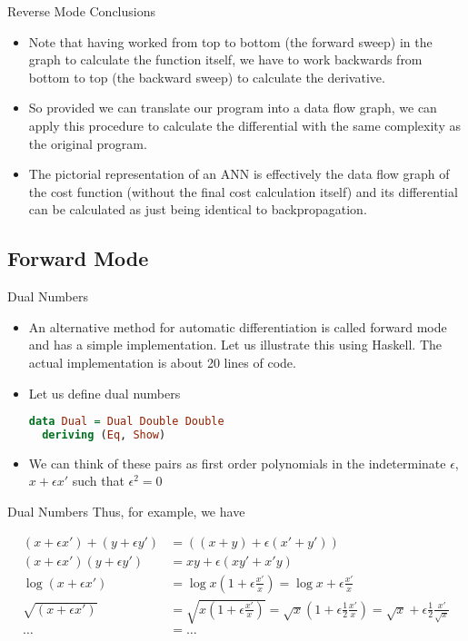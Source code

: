 \documentclass{beamer}
\begin{document}
\begin{frame}[fragile]{Reverse Mode Conclusions}
\begin{itemize}
\item
Note that having worked from top to bottom (the forward sweep) in the
graph to calculate the function itself, we have to work backwards from
bottom to top (the backward sweep) to calculate the derivative.
\item
So provided we can translate our program into a data flow graph, we can
apply this procedure to calculate the differential with the same
complexity as the original program.
\item
The pictorial representation of an ANN is effectively the data flow
graph of the cost function (without the final cost calculation itself)
and its differential can be calculated as just being identical to
backpropagation.
\end{itemize}
\end{frame}

\subsection{Forward Mode}

\begin{frame}[fragile]{Dual Numbers}
\begin{itemize}
\item
An alternative method for automatic differentiation is called forward
mode and has a simple implementation. Let us illustrate this using
Haskell. The actual implementation is about 20 lines of code.
\item
Let us define dual numbers

\begin{lstlisting}[language=Haskell]
data Dual = Dual Double Double
  deriving (Eq, Show)
\end{lstlisting}
\item
We can think of these pairs as first order polynomials in the
indeterminate $\epsilon$, $x + \epsilon x'$ such that $\epsilon^2 = 0$
\end{itemize}
\end{frame}

\begin{frame}[fragile]{Dual Numbers}
Thus, for example, we have

$$
\begin{aligned}
(x + \epsilon x') + (y + \epsilon y') &= ((x + y) + \epsilon (x' + y')) \\
(x + \epsilon x')(y + \epsilon y') &= xy + \epsilon (xy' + x'y) \\
\log (x + \epsilon x') &=
\log x (1 + \epsilon \frac {x'}{x}) =
\log x + \epsilon\frac{x'}{x} \\
\sqrt{(x + \epsilon x')} &=
\sqrt{x(1 + \epsilon\frac{x'}{x})} =
\sqrt{x}(1 + \epsilon\frac{1}{2}\frac{x'}{x}) =
\sqrt{x} + \epsilon\frac{1}{2}\frac{x'}{\sqrt{x}} \\
\ldots &= \ldots
\end{aligned}
$$
\end{frame}
\end{document}
